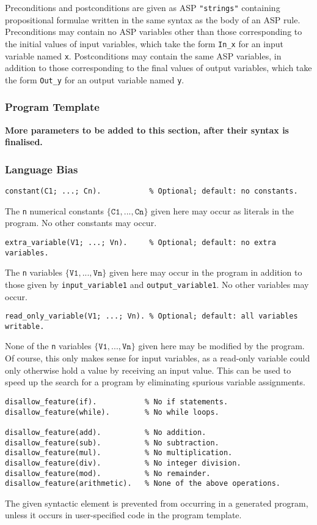\documentclass[a4paper,twoside,notitlepage]{article}
\newcommand{\ttt}{\texttt}
\begin{document}
Preconditions and postconditions are given as ASP \verb|"strings"|
containing propositional formulae written in the same syntax as the body of an 
ASP rule. Preconditions may contain no ASP variables other than those 
corresponding to the initial values of input variables, which take the form 
\ttt{In\_x} for an input variable named \ttt{x}. Postconditions may contain 
the same ASP variables, in addition to those corresponding to the final values 
of output variables, which take the form \ttt{Out\_y} for an output variable 
named \ttt{y}.

\subsubsection{Program Template}

\textbf{More parameters to be added to this section, after their syntax is 
finalised.}

\subsubsection{Language Bias}

\begin{verbatim}
constant(C1; ...; Cn).           % Optional; default: no constants.
\end{verbatim}
The \ttt{n} numerical constants $\{\ttt{C1}, ..., \ttt{Cn}\}$ 
given here may occur as literals in the program. No other constants may occur.

\begin{verbatim}
extra_variable(V1; ...; Vn).     % Optional; default: no extra variables.
\end{verbatim}
The \texttt{n} variables $\{\ttt{V1}, ..., \ttt{Vn}\}$ given here 
may occur in the program in addition to those given by \ttt{input\_variable\/1}
and \ttt{output\_variable\/1}. No other variables may occur.

\begin{verbatim}
read_only_variable(V1; ...; Vn). % Optional; default: all variables writable.
\end{verbatim}
None of the \texttt{n} variables $\{\ttt{V1}, ..., \ttt{Vn}\}$ 
given here may be modified by the program. Of course, this only makes sense 
for input variables, as a read-only variable could only otherwise hold a value 
by receiving an input value. This can be used to speed up the search for a 
program by eliminating spurious variable assignments.

\begin{verbatim}
disallow_feature(if).           % No if statements.
disallow_feature(while).        % No while loops.

disallow_feature(add).          % No addition.
disallow_feature(sub).          % No subtraction.
disallow_feature(mul).          % No multiplication.
disallow_feature(div).          % No integer division.
disallow_feature(mod).          % No remainder.
disallow_feature(arithmetic).   % None of the above operations.
\end{verbatim}
The given syntactic element is prevented from occurring in a generated 
program, unless it occurs in user-specified code in the program template.
\end{document}
